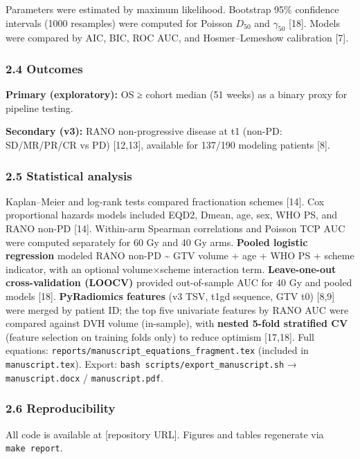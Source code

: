 \documentclass[
  11pt,
]{article}
\begin{document}
Parameters were estimated by maximum likelihood. Bootstrap 95\%
confidence intervals (1000 resamples) were computed for Poisson
\(D_{50}\) and \(\gamma_{50}\) {[}18{]}. Models were compared by AIC,
BIC, ROC AUC, and Hosmer--Lemeshow calibration {[}7{]}.

\subsubsection{2.4 Outcomes}\label{outcomes}

\textbf{Primary (exploratory):} OS ≥ cohort median (51 weeks) as a
binary proxy for pipeline testing.

\textbf{Secondary (v3):} RANO non-progressive disease at t1 (non-PD:
SD/MR/PR/CR vs PD) {[}12,13{]}, available for 137/190 modeling patients
{[}8{]}.

\subsubsection{2.5 Statistical analysis}\label{statistical-analysis}

Kaplan--Meier and log-rank tests compared fractionation schemes
{[}14{]}. Cox proportional hazards models included EQD2, Dmean, age,
sex, WHO PS, and RANO non-PD {[}14{]}. Within-arm Spearman correlations
and Poisson TCP AUC were computed separately for 60 Gy and 40 Gy arms.
\textbf{Pooled logistic regression} modeled RANO non-PD
\textasciitilde{} GTV volume + age + WHO PS + scheme indicator, with an
optional volume×scheme interaction term. \textbf{Leave-one-out
cross-validation (LOOCV)} provided out-of-sample AUC for 40 Gy and
pooled models {[}18{]}. \textbf{PyRadiomics features} (v3 TSV, t1gd
sequence, GTV t0) {[}8,9{]} were merged by patient ID; the top five
univariate features by RANO AUC were compared against DVH volume
(in-sample), with \textbf{nested 5-fold stratified CV} (feature
selection on training folds only) to reduce optimism {[}17,18{]}. Full
equations: \texttt{reports/manuscript\_equations\_fragment.tex}
(included in \texttt{manuscript.tex}). Export:
\texttt{bash\ scripts/export\_manuscript.sh} → \texttt{manuscript.docx}
/ \texttt{manuscript.pdf}.

\subsubsection{2.6 Reproducibility}\label{reproducibility}

All code is available at {[}repository URL{]}. Figures and tables
regenerate via \texttt{make\ report}.
\end{document}
